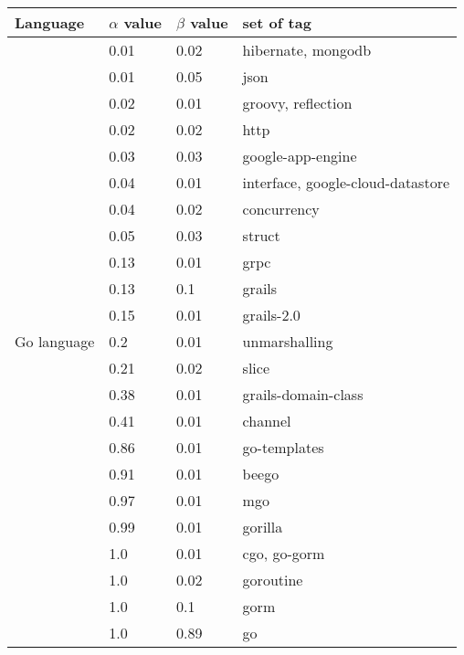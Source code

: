 \begin{longtable}{|l|l|l|l|}

\hline
Language                      & $\alpha$ value & $\beta$ value & set of tag \\ \hline
\multirow{24}{*}{Go language}  & 0.01  &  0.02  &  hibernate, mongodb   \\ \cline{2-4}
               & 0.01  &  0.05  &  json   \\ \cline{2-4}
               & 0.02  &  0.01  &  groovy, reflection   \\ \cline{2-4}
               & 0.02  &  0.02  &  http   \\ \cline{2-4}
               & 0.03  &  0.03  &  google-app-engine   \\ \cline{2-4}
               & 0.04  &  0.01  &  interface, google-cloud-datastore   \\ \cline{2-4}
               & 0.04  &  0.02  &  concurrency   \\ \cline{2-4}
               & 0.05  &  0.03  &  struct   \\ \cline{2-4}
               & 0.13  &  0.01  &  grpc   \\ \cline{2-4}
               & 0.13  &  0.1   &  grails   \\ \cline{2-4}
               & 0.15  &  0.01  &  grails-2.0   \\ \cline{2-4}
               & 0.2   &  0.01  &  unmarshalling   \\ \cline{2-4}
               & 0.21  &  0.02  &  slice   \\ \cline{2-4}
               & 0.38  &  0.01  &  grails-domain-class   \\ \cline{2-4}
               & 0.41  &  0.01  &  channel   \\ \cline{2-4}
               & 0.86  &  0.01  &  go-templates   \\ \cline{2-4}
               & 0.91  &  0.01  &  beego   \\ \cline{2-4}
               & 0.97  &  0.01  &  mgo   \\ \cline{2-4}
               & 0.99  &  0.01  &  gorilla   \\ \cline{2-4}
               & 1.0   &  0.01  &  cgo, go-gorm   \\ \cline{2-4}
               & 1.0   &  0.02  &  goroutine   \\ \cline{2-4}
               & 1.0   &  0.1   &  gorm   \\ \cline{2-4}
               & 1.0   &  0.89  &  go   \\ \hline


\end{longtable}

